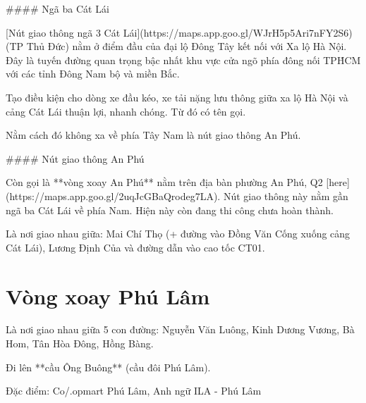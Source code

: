 #### Ngã ba Cát Lái

[Nút giao thông ngã 3 Cát Lái](https://maps.app.goo.gl/WJrH5p5Ari7nFY2S6) (TP Thủ Đức) nằm ở điểm đầu của đại lộ Đông Tây kết nối với Xa lộ Hà Nội. Đây là tuyến đường quan trọng bậc nhất khu vực cửa ngõ phía đông nối TP\.HCM với các tỉnh Đông Nam bộ và miền Bắc.

Tạo điều kiện cho dòng xe đầu kéo, xe tải nặng lưu thông giữa xa lộ Hà Nội và cảng Cát Lái thuận lợi, nhanh chóng. Từ đó có tên gọi.

Nằm cách đó không xa về phía Tây Nam là nút giao thông An Phú.

#### Nút giao thông An Phú

Còn gọi là **vòng xoay An Phú** nằm trên địa bàn phường An Phú, Q2 [here](https://maps.app.goo.gl/2uqJcGBaQrodeg7LA). Nút giao thông này nằm gần ngã ba Cát Lái về phía Nam. Hiện này còn đang thi công chưa hoàn thành.

Là nơi giao nhau giữa: Mai Chí Thọ (+ đường vào Đồng Văn Cống xuống cảng Cát Lái), Lương Định Của và đường dẫn vào cao tốc CT01.

\section{Vòng xoay Phú Lâm}

Là nơi giao nhau giữa 5 con đường: Nguyễn Văn Luông, Kinh Dương Vương, Bà Hom, Tân Hòa Đông, Hồng Bàng.

Đi lên **cầu Ông Buông** (cầu đôi Phú Lâm).

Đặc điểm: Co/.opmart Phú Lâm, Anh ngữ ILA - Phú Lâm
